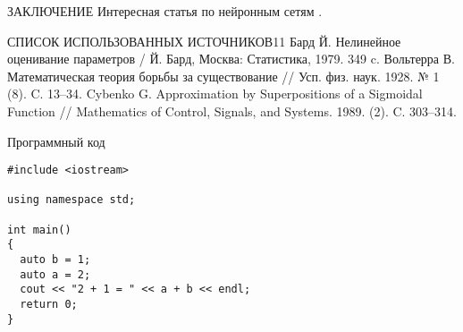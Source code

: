 \documentclass[14pt, a4paper, oneside, final]{extarticle}
\begin{document}
\begin{gostheader}{ЗАКЛЮЧЕНИЕ}
Интересная статья по нейронным сетям \cite{Cybenko}.
\end{gostheader}


%
%

\begin{gostbibliography}{СПИСОК ИСПОЛЬЗОВАННЫХ ИСТОЧНИКОВ}{11}
 Бард Й. Нелинейное оценивание параметров / Й. Бард, Москва: Статистика, 1979. 349 c.
 Вольтерра В. Математическая теория борьбы за существование // Усп. физ. наук. 1928. № 1 (8). C. 13–34.
 Cybenko G. Approximation by Superpositions of a Sigmoidal Function // Mathematics of Control, Signals, and Systems. 1989. (2). C. 303–314.
\end{gostbibliography}



\begin{gostappendix}{Программный код}
\lstset{language=[11]c++,basicstyle=\ttfamily, showstringspaces=false}

\begin{lstlisting}
#include <iostream>

using namespace std;

int main()
{
  auto b = 1;
  auto a = 2;
  cout << "2 + 1 = " << a + b << endl;
  return 0;
}
\end{lstlisting}

\end{gostappendix}
\end{document}
